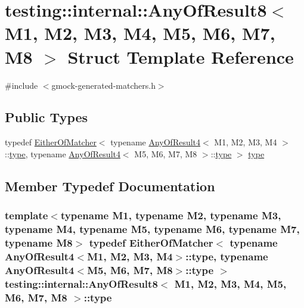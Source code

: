 \hypertarget{structtesting_1_1internal_1_1_any_of_result8}{}\section{testing\+:\+:internal\+:\+:Any\+Of\+Result8$<$ M1, M2, M3, M4, M5, M6, M7, M8 $>$ Struct Template Reference}
\label{structtesting_1_1internal_1_1_any_of_result8}


{\ttfamily \#include $<$gmock-\/generated-\/matchers.\+h$>$}

\subsection*{Public Types}
\begin{DoxyCompactItemize}
\item 
typedef \hyperlink{classtesting_1_1internal_1_1_either_of_matcher}{Either\+Of\+Matcher}$<$ typename \hyperlink{structtesting_1_1internal_1_1_any_of_result4}{Any\+Of\+Result4}$<$ M1, M2, M3, M4 $>$\+::\hyperlink{structtesting_1_1internal_1_1_any_of_result8_a8f8a1e78a019965c24bd22c78885747d}{type}, typename \hyperlink{structtesting_1_1internal_1_1_any_of_result4}{Any\+Of\+Result4}$<$ M5, M6, M7, M8 $>$\+::\hyperlink{structtesting_1_1internal_1_1_any_of_result8_a8f8a1e78a019965c24bd22c78885747d}{type} $>$ \hyperlink{structtesting_1_1internal_1_1_any_of_result8_a8f8a1e78a019965c24bd22c78885747d}{type}
\end{DoxyCompactItemize}


\subsection{Member Typedef Documentation}
\subsubsection[{\texorpdfstring{type}{type}}]{\setlength{\rightskip}{0pt plus 5cm}template$<$typename M1, typename M2, typename M3, typename M4, typename M5, typename M6, typename M7, typename M8$>$ typedef {\bf Either\+Of\+Matcher}$<$ typename {\bf Any\+Of\+Result4}$<$M1, M2, M3, M4$>$\+::{\bf type}, typename {\bf Any\+Of\+Result4}$<$M5, M6, M7, M8$>$\+::{\bf type} $>$ {\bf testing\+::internal\+::\+Any\+Of\+Result8}$<$ M1, M2, M3, M4, M5, M6, M7, M8 $>$\+::{\bf type}}\hypertarget{structtesting_1_1internal_1_1_any_of_result8_a8f8a1e78a019965c24bd22c78885747d}{}\label{structtesting_1_1internal_1_1_any_of_result8_a8f8a1e78a019965c24bd22c78885747d}


